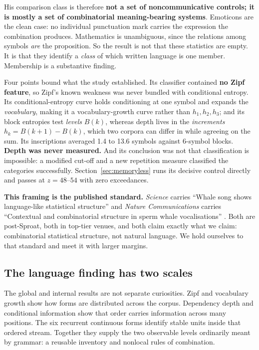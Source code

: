 \documentclass[11pt,a4paper]{article}
\begin{document}
His comparison class is therefore \textbf{not a set of noncommunicative controls; it is
mostly a set of combinatorial meaning-bearing systems}. Emoticons are the clean case: no
individual punctuation mark carries the expression the combination produces. Mathematics
is unambiguous, since the relations among symbols \emph{are} the proposition. So the
result is not that these statistics are empty. It is that they identify a \emph{class}
of which written language is one member. Membership is a substantive finding.

Four points bound what the study established. Its classifier contained \textbf{no Zipf
feature}, so Zipf's known weakness was never bundled with conditional entropy. Its
conditional-entropy curve holds conditioning at one symbol and expands the
\emph{vocabulary}, making it a vocabulary-growth curve rather than $h_1, h_2, h_3$; and
its block entropies test \emph{levels} $B(k)$, whereas depth lives in the
\emph{increments} $h_k = B(k{+}1) - B(k)$, which two corpora can differ in while
agreeing on the sum. Its inscriptions averaged 1.4 to 13.6 symbols against 6-symbol
blocks. \textbf{Depth was never measured.} And its conclusion was not that
classification is impossible: a modified cut-off and a new repetition measure classified
the categories successfully. Section~\ref{sec:memoryless} runs its decisive control
directly and passes at $z = 48$--$54$ with zero exceedances.

\textbf{This framing is the published standard.} \emph{Science} carries ``Whale song
shows language-like statistical structure'' \cite{arnon2025} and \emph{Nature
Communications} carries ``Contextual and combinatorial structure in sperm whale
vocalisations'' \cite{sharma2024}. Both are post-Sproat, both in top-tier venues, and
both claim exactly what we claim: combinatorial statistical structure, not natural
language. We hold ourselves to that standard and meet it with larger margins.

\subsection{The language finding has two scales}

The global and internal results are not separate curiosities. Zipf and vocabulary
growth show how forms are distributed across the corpus. Dependency depth and
conditional information show that order carries information across many positions.
The six recurrent continuous forms identify stable units inside that ordered stream.
Together they supply the two observable levels ordinarily meant by grammar: a reusable
inventory and nonlocal rules of combination.
\end{document}
